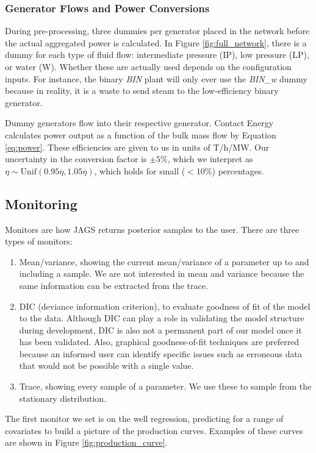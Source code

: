 \documentclass[a4paper, 12pt]{article}
\begin{document}
\subsubsection{Generator Flows and Power Conversions}
During pre-processing, three dummies per generator placed in the network before the actual aggregated power is calculated. In Figure \ref{fig:full_network}, there is a dummy for each type of fluid flow: intermediate pressure (IP), low pressure (LP), or water (W). Whether these are actually used depends on the configuration inputs. For instance, the binary \emph{BIN} plant will only ever use the \emph{BIN\_w} dummy because in reality, it is a waste to send steam to the low-efficiency binary generator.

Dummy generators flow into their respective generator. Contact Energy calculates power output as a function of the bulk mass flow by Equation \ref{eq:power}. These efficiencies are given to us in units of T/h/MW. Our uncertainty in the conversion factor is $\pm5\%$, which we interpret as $\eta \sim \text{Unif}\left( 0.95\overline\eta, 1.05\overline\eta \right)$, which holds for small ($<$10\%) percentages.

\subsection{Monitoring}

Monitors are how JAGS returns posterior samples to the user. There are three types of monitors:

\begin{enumerate}
\item Mean/variance, showing the current mean/variance of a parameter up to and including a sample. We are not interested in mean and variance because the same information can be extracted from the trace.
\item DIC (deviance information criterion), to evaluate goodness of fit of the model to the data. Although DIC can play a role in validating the model structure during development, DIC is also not a permanent part of our model once it has been validated. Also, graphical goodness-of-fit techniques are preferred because an informed user can identify specific issues such as erroneous data that would not be possible with a single value.
\item Trace, showing every sample of a parameter. We use these to sample from the stationary distribution.
\end{enumerate}

The first monitor we set is on the well regression, predicting for a range of covariates to build a picture of the production curves. Examples of these curves are shown in Figure \ref{fig:production_curve}.
\end{document}
